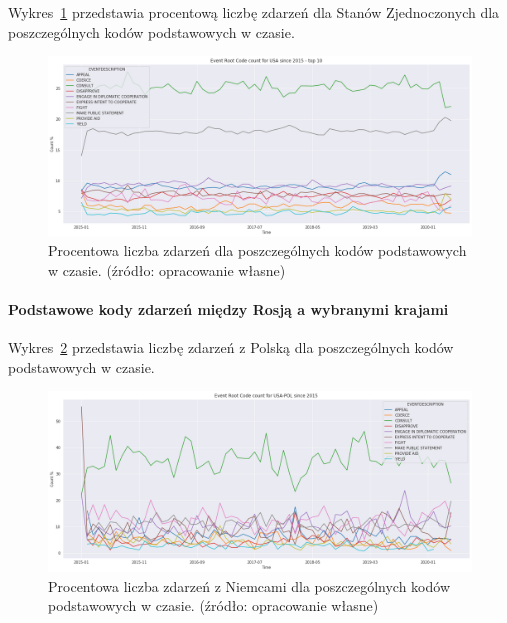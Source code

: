 \documentclass[11pt]{report}
\begin{document}
    Wykres~\ref{fig:USAPERCpercinTIME} przedstawia procentową liczbę zdarzeń dla Stanów Zjednoczonych dla poszczególnych kodów podstawowych w czasie.
    \begin{figure}[!htp]
        \centering
        \includegraphics[width=\linewidth]{fig/USA/USAERCpercinTIME.png}
        \caption{Procentowa liczba zdarzeń dla poszczególnych kodów podstawowych w czasie. (źródło: opracowanie własne)}
        \label{fig:USAPERCpercinTIME}
    \end{figure}

    \paragraph{Podstawowe kody zdarzeń między Rosją a wybranymi krajami}

    Wykres~\ref{fig:USAPOLERC} przedstawia liczbę zdarzeń z Polską dla poszczególnych kodów podstawowych w czasie.
    \begin{figure}[!htp]
        \centering
        \includegraphics[width=\linewidth]{fig/USA/USAPOLERCperc.png}
        \caption{Procentowa liczba zdarzeń z Niemcami dla poszczególnych kodów podstawowych w czasie. (źródło: opracowanie własne)}
        \label{fig:USAPOLERC}
    \end{figure}
\end{document}
